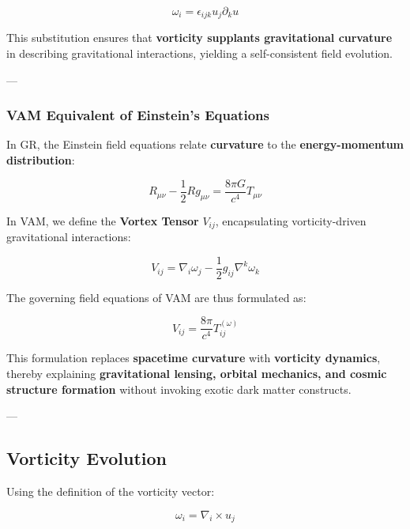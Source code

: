 \documentclass[a4paper,10pt]{article}
\begin{document}
\begin{equation*}
    \omega_i = \epsilon_{ijk} u_j \partial_k u
\end{equation*}

This substitution ensures that \textbf{vorticity supplants gravitational curvature} in describing gravitational interactions, yielding a self-consistent field evolution.



---

\subsubsection*{VAM Equivalent of Einstein's Equations}
In GR, the Einstein field equations relate \textbf{curvature} to the \textbf{energy-momentum distribution}:

\begin{equation*}
    R_{\mu\nu} - \frac{1}{2} R g_{\mu\nu} = \frac{8\pi G}{c^4} T_{\mu\nu}
\end{equation*}


In VAM, we define the \textbf{Vortex Tensor} $V_{ij}$, encapsulating vorticity-driven gravitational interactions:

\begin{equation*}
    V_{ij} = \nabla_i \omega_j - \frac{1}{2} g_{ij} \nabla^k \omega_k
\end{equation*}



The governing field equations of VAM are thus formulated as:

\begin{equation*}
    V_{ij} = \frac{8\pi}{c^4} T^{(\omega)}_{ij}
\end{equation*}


This formulation replaces \textbf{spacetime curvature} with \textbf{vorticity dynamics}, thereby explaining \textbf{gravitational lensing, orbital mechanics, and cosmic structure formation} without invoking exotic dark matter constructs.

---



\subsection{Vorticity Evolution}

Using the definition of the vorticity vector:

\begin{equation*}
    \omega_i = \nabla_i \times u_j
\end{equation*}
\end{document}
